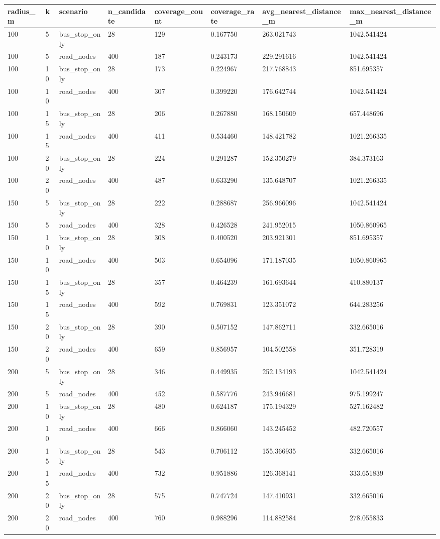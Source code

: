 \begin{tabular}{llllllll}
\hline
radius_m & k & scenario & n_candidate & coverage_count & coverage_rate & avg_nearest_distance_m & max_nearest_distance_m \\
\hline
100 & 5 & bus_stop_only & 28 & 129 & 0.167750 & 263.021743 & 1042.541424 \\
100 & 5 & road_nodes & 400 & 187 & 0.243173 & 229.291616 & 1042.541424 \\
100 & 10 & bus_stop_only & 28 & 173 & 0.224967 & 217.768843 & 851.695357 \\
100 & 10 & road_nodes & 400 & 307 & 0.399220 & 176.642744 & 1042.541424 \\
100 & 15 & bus_stop_only & 28 & 206 & 0.267880 & 168.150609 & 657.448696 \\
100 & 15 & road_nodes & 400 & 411 & 0.534460 & 148.421782 & 1021.266335 \\
100 & 20 & bus_stop_only & 28 & 224 & 0.291287 & 152.350279 & 384.373163 \\
100 & 20 & road_nodes & 400 & 487 & 0.633290 & 135.648707 & 1021.266335 \\
150 & 5 & bus_stop_only & 28 & 222 & 0.288687 & 256.966096 & 1042.541424 \\
150 & 5 & road_nodes & 400 & 328 & 0.426528 & 241.952015 & 1050.860965 \\
150 & 10 & bus_stop_only & 28 & 308 & 0.400520 & 203.921301 & 851.695357 \\
150 & 10 & road_nodes & 400 & 503 & 0.654096 & 171.187035 & 1050.860965 \\
150 & 15 & bus_stop_only & 28 & 357 & 0.464239 & 161.693644 & 410.880137 \\
150 & 15 & road_nodes & 400 & 592 & 0.769831 & 123.351072 & 644.283256 \\
150 & 20 & bus_stop_only & 28 & 390 & 0.507152 & 147.862711 & 332.665016 \\
150 & 20 & road_nodes & 400 & 659 & 0.856957 & 104.502558 & 351.728319 \\
200 & 5 & bus_stop_only & 28 & 346 & 0.449935 & 252.134193 & 1042.541424 \\
200 & 5 & road_nodes & 400 & 452 & 0.587776 & 243.946681 & 975.199247 \\
200 & 10 & bus_stop_only & 28 & 480 & 0.624187 & 175.194329 & 527.162482 \\
200 & 10 & road_nodes & 400 & 666 & 0.866060 & 143.245452 & 482.720557 \\
200 & 15 & bus_stop_only & 28 & 543 & 0.706112 & 155.366935 & 332.665016 \\
200 & 15 & road_nodes & 400 & 732 & 0.951886 & 126.368141 & 333.651839 \\
200 & 20 & bus_stop_only & 28 & 575 & 0.747724 & 147.410931 & 332.665016 \\
200 & 20 & road_nodes & 400 & 760 & 0.988296 & 114.882584 & 278.055833 \\
\hline
\end{tabular}
